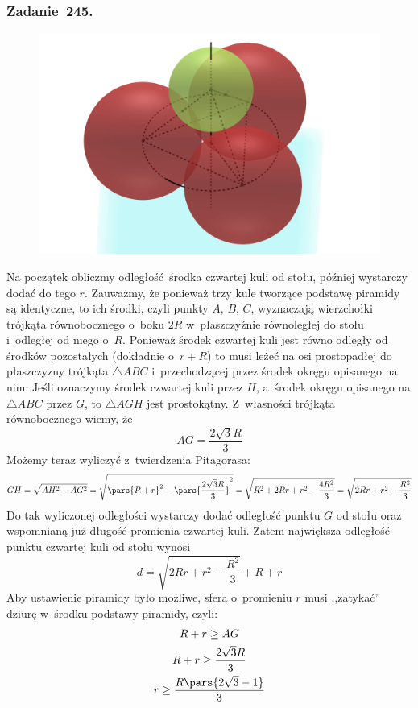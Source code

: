 \subsubsection*{Zadanie~245.}
\begin{figure}[H]
    \centering
    \includegraphics[width=\textwidth]{img/2021_03_01/245/space.png}
\end{figure}
Na początek obliczmy odległość środka czwartej kuli od stołu, później wystarczy dodać do tego \(r\). Zauważmy, że ponieważ trzy kule tworzące podstawę piramidy są identyczne, to ich środki, czyli punkty \(A\), \(B\), \(C\), wyznaczają wierzchołki trójkąta równobocznego o~boku \(2R\) w~płaszczyźnie równoległej do stołu i~odległej od niego o~\(R\). Ponieważ środek czwartej kuli jest równo odległy od środków pozostałych (dokładnie o~\(r + R\)) to musi leżeć na osi prostopadłej do płaszczyzny trójkąta \(\triangle{ABC}\) i~przechodzącej przez środek okręgu opisanego na nim. Jeśli oznaczymy środek czwartej kuli przez \(H\), a~środek okręgu opisanego na \(\triangle{ABC}\) przez \(G\), to \(\triangle{AGH}\) jest prostokątny. Z~własności trójkąta równobocznego wiemy, że
\begin{equation*}
    AG = \frac{2\sqrt{3}R}{3}
\end{equation*}
Możemy teraz wyliczyć z~twierdzenia Pitagorasa:
\begin{equation*}
    GH
    = \sqrt{AH^2 - AG^2}
    = \sqrt{\pars{R + r}^2 - \pars{\frac{2\sqrt{3}R}{3}}^2}
    = \sqrt{R^2 + 2Rr + r^2 - \frac{4R^2}{3}}
    = \sqrt{2Rr + r^2 - \frac{R^2}{3}}
\end{equation*}
Do tak wyliczonej odległości wystarczy dodać odległość punktu \(G\) od stołu oraz wspomnianą już długość promienia czwartej kuli. Zatem największa odległość punktu czwartej kuli od stołu wynosi
\begin{equation*}
    d = \sqrt{2Rr + r^2 - \frac{R^2}{3}} + R + r
\end{equation*}
Aby ustawienie piramidy było możliwe, sfera o~promieniu \(r\) musi ,,zatykać'' dziurę w~środku podstawy piramidy, czyli:
\begin{gather*}
    R + r \geq AG\\
    R + r \geq \frac{2\sqrt{3}R}{3}\\
    r \geq \frac{R\pars{2\sqrt{3} - 1}}{3}
\end{gather*}
